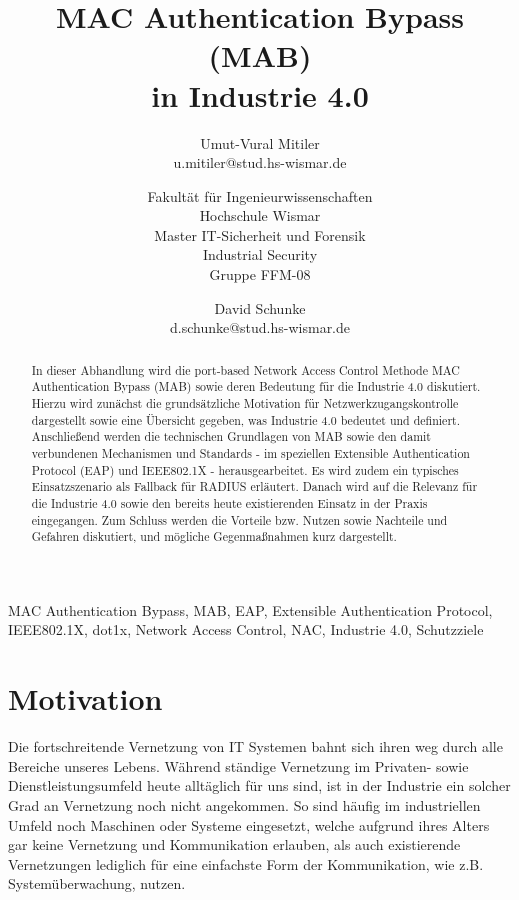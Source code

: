 \documentclass[conference]{IEEEtran}
\begin{document}
\title{MAC Authentication Bypass (MAB)\\ in Industrie 4.0}
\author{
	Umut-Vural Mitiler\\
	u.mitiler@stud.hs-wismar.de
	\and
	Fakultät für Ingenieurwissenschaften\\
	Hochschule Wismar\\
	Master IT-Sicherheit und Forensik\\
	Industrial Security\\
	Gruppe FFM-08
	\and
	David Schunke\\
	d.schunke@stud.hs-wismar.de
}

\maketitle

\thispagestyle{plain}
\pagestyle{plain}

%

\begin{abstract}
In dieser Abhandlung wird die port-based Network Access Control Methode MAC Authentication Bypass (MAB) sowie deren Bedeutung für die Industrie 4.0 diskutiert. Hierzu wird zunächst die grundsätzliche Motivation für Netzwerkzugangskontrolle dargestellt sowie eine Übersicht gegeben, was Industrie 4.0 bedeutet und definiert. Anschließend werden die technischen Grundlagen von MAB sowie den damit verbundenen Mechanismen und Standards - im speziellen Extensible Authentication Protocol (EAP) und IEEE802.1X - herausgearbeitet. Es wird zudem ein typisches Einsatzszenario als Fallback für RADIUS erläutert. Danach wird auf die Relevanz für die Industrie 4.0 sowie den bereits heute existierenden Einsatz in der Praxis eingegangen. Zum Schluss werden die Vorteile bzw. Nutzen sowie Nachteile und Gefahren diskutiert, und mögliche Gegenmaßnahmen kurz dargestellt. 
\end{abstract}

\vspace{1em}

\begin{IEEEkeywords}
MAC Authentication Bypass, MAB, EAP, Extensible Authentication Protocol, IEEE802.1X, dot1x, Network Access Control, NAC, Industrie 4.0, Schutzziele
\end{IEEEkeywords}

%

\vspace{1em}
\section{Motivation}
Die fortschreitende Vernetzung von IT Systemen bahnt sich ihren weg durch alle Bereiche unseres Lebens. Während ständige Vernetzung im Privaten- sowie Dienstleistungsumfeld heute alltäglich für uns sind, ist in der Industrie ein solcher Grad an Vernetzung noch nicht angekommen. So sind häufig im industriellen Umfeld noch Maschinen oder Systeme eingesetzt, welche aufgrund ihres Alters gar keine Vernetzung und Kommunikation erlauben, als auch existierende Vernetzungen lediglich für eine einfachste Form der Kommunikation, wie z.B. Systemüberwachung, nutzen.\\
\end{document}
